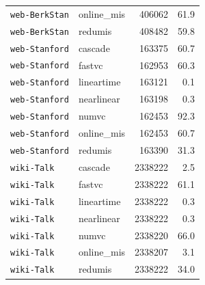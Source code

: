 \begin{longtable}{l l r r}
\texttt{web-BerkStan} & online\_mis & 406062 & 61.9 \\
\texttt{web-BerkStan} & redumis & 408482 & 59.8 \\
\texttt{web-Stanford} & cascade & 163375 & 60.7 \\
\texttt{web-Stanford} & fastvc & 162953 & 60.3 \\
\texttt{web-Stanford} & lineartime & 163121 & 0.1 \\
\texttt{web-Stanford} & nearlinear & 163198 & 0.3 \\
\texttt{web-Stanford} & numvc & 162453 & 92.3 \\
\texttt{web-Stanford} & online\_mis & 162453 & 60.7 \\
\texttt{web-Stanford} & redumis & 163390 & 31.3 \\
\texttt{wiki-Talk} & cascade & 2338222 & 2.5 \\
\texttt{wiki-Talk} & fastvc & 2338222 & 61.1 \\
\texttt{wiki-Talk} & lineartime & 2338222 & 0.3 \\
\texttt{wiki-Talk} & nearlinear & 2338222 & 0.3 \\
\texttt{wiki-Talk} & numvc & 2338220 & 66.0 \\
\texttt{wiki-Talk} & online\_mis & 2338207 & 3.1 \\
\texttt{wiki-Talk} & redumis & 2338222 & 34.0 \\
\end{longtable}
\normalsize
